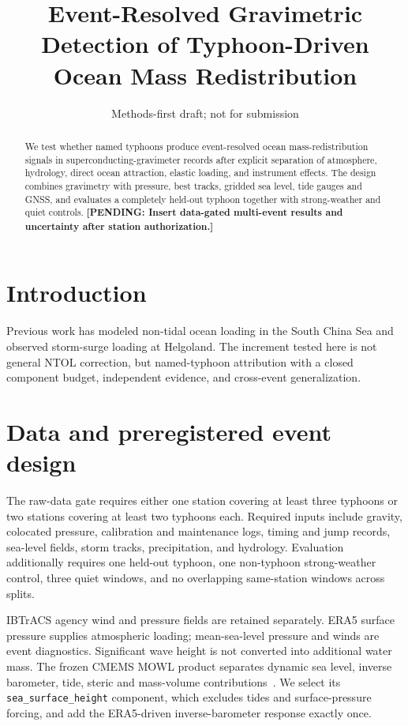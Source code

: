 \documentclass[11pt]{article}
\title{Event-Resolved Gravimetric Detection of Typhoon-Driven Ocean Mass Redistribution}
\author{\TyphoonPending{author list and data-provider collaboration}}
\date{Methods-first draft; not for submission}
\newcommand{\TyphoonPending}[1]{\textbf{[PENDING: #1]}}
\begin{document}
\maketitle

\begin{abstract}
We test whether named typhoons produce event-resolved ocean mass-redistribution
signals in superconducting-gravimeter records after explicit separation of
atmosphere, hydrology, direct ocean attraction, elastic loading, and instrument
effects. The design combines gravimetry with pressure, best tracks, gridded sea
level, tide gauges and GNSS, and evaluates a completely held-out typhoon together
with strong-weather and quiet controls. \TyphoonPending{Insert data-gated
multi-event results and uncertainty after station authorization.}
\end{abstract}

\section{Introduction}
Previous work has modeled non-tidal ocean loading in the South China Sea and
observed storm-surge loading at Helgoland. The increment tested here is not
general NTOL correction, but named-typhoon attribution with a closed component
budget, independent evidence, and cross-event generalization.

\section{Data and preregistered event design}
The raw-data gate requires either one station covering at least three typhoons or
two stations covering at least two typhoons each. Required inputs include
gravity, colocated pressure, calibration and maintenance logs, timing and jump
records, sea-level fields, storm tracks, precipitation, and hydrology.
Evaluation additionally requires one
held-out typhoon, one non-typhoon strong-weather control, three quiet windows,
and no overlapping same-station windows across splits.

IBTrACS agency wind and pressure fields are retained separately. ERA5 surface
pressure supplies atmospheric loading; mean-sea-level pressure and winds are
event diagnostics. Significant wave height is not converted into additional
water mass. The frozen CMEMS MOWL product separates dynamic sea level, inverse
barometer, tide, steric and mass-volume contributions~\cite{CMEMSGLO024}. We
select its \texttt{sea\_surface\_height} component, which excludes tides and
surface-pressure forcing, and add the ERA5-driven inverse-barometer response
exactly once.
\end{document}
